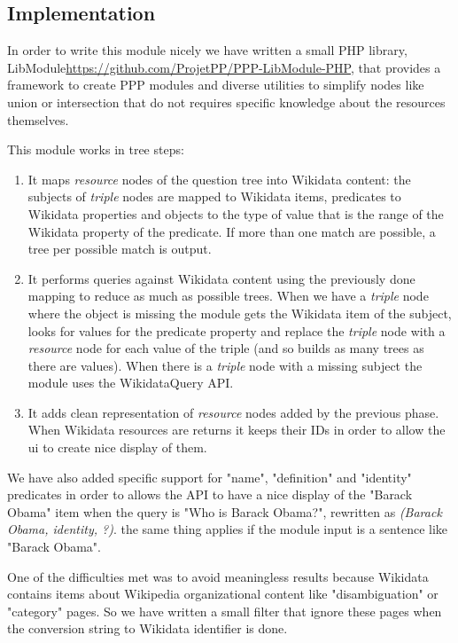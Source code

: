 \subsection{Implementation}
In order to write this module nicely we have written a small PHP library, LibModule\url{https://github.com/ProjetPP/PPP-LibModule-PHP}, that provides a framework to create PPP modules and diverse utilities to simplify nodes like union or intersection that do not requires specific knowledge about the resources themselves.

This module works in tree steps:
\begin{enumerate}
    \item It maps \textit{resource} nodes of the question tree into Wikidata content: the subjects of \textit{triple} nodes are mapped to Wikidata items, predicates to Wikidata properties and objects to the type of value that is the range of the Wikidata property of the predicate. If more than one match are possible, a tree per possible match is output.
    \item It performs queries against Wikidata content using the previously done mapping to reduce as much as possible trees. When we have a \textit{triple} node where the object is missing the module gets the Wikidata item of the subject, looks for values for the predicate property and replace the \textit{triple} node with a \textit{resource} node for each value of the triple (and so builds as many trees as there are values). When there is a \textit{triple} node with a missing subject the module uses the WikidataQuery API.
    \item It adds clean representation of \textit{resource} nodes added by the previous phase. When Wikidata resources are returns it keeps their IDs in order to allow the ui to create nice display of them.
\end{enumerate}

We have also added specific support for "name", "definition" and "identity" predicates in order to allows the API to have a nice display of the "Barack Obama" item when the query is "Who is Barack Obama?", rewritten as \textit{(Barack Obama, identity, ?)}. the same thing applies if the module input is a sentence like "Barack Obama".

One of the difficulties met was to avoid meaningless results because Wikidata contains items about Wikipedia organizational content like "disambiguation" or "category" pages. So we have written a small filter that ignore these pages when the conversion string to Wikidata identifier is done.


